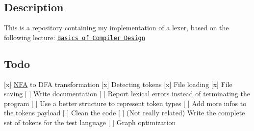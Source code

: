 \subsection*{Description}

This is a repository containing my implementation of a lexer, based on the following lecture\+: \href{http://hjemmesider.diku.dk/~torbenm/Basics/basics_lulu2.pdf}{\tt Basics of Compiler Design}

\subsection*{Todo}

\mbox{[}x\mbox{]} \hyperlink{classNFA}{N\+FA} to D\+FA transformation \mbox{[}x\mbox{]} Detecting tokens \mbox{[}x\mbox{]} File loading \mbox{[}x\mbox{]} File saving \mbox{[} \mbox{]} Write documentation \mbox{[} \mbox{]} Report lexical errors instead of terminating the program \mbox{[} \mbox{]} Use a better structure to represent token types \mbox{[} \mbox{]} Add more infos to the tokens payload \mbox{[} \mbox{]} Clean the code \mbox{[} \mbox{]} (Not really related) Write the complete set of tokens for the test language \mbox{[} \mbox{]} Graph optimization 